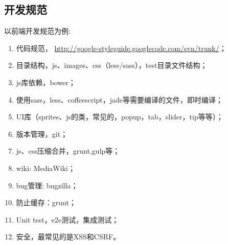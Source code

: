 \subsection{开发规范}
\par 以前端开发规范为例:
\begin{enumerate}[label=(\arabic*)]
    \item 代码规范， \url{http://google-styleguide.googlecode.com/svn/trunk/}；
    \item 目录结构，js、images、css（less/sass），test目录文件结构；
    \item js库依赖，bower；
    \item 使用sass，less、coffeescript，jade等需要编译的文件，即时编译；
    \item UI库（sprites、js的类，常见的，popup，tab，slider，tip等等）；
    \item 版本管理，git；
    \item js、css压缩合并，grunt,gulp等；
    \item wiki: MediaWiki；  
    \item bug管理: bugzilla；    
    \item 防止缓存：grunt；
    \item Unit test，e2e测试，集成测试；      
    \item 安全，最常见的是XSS和CSRF。
\end{enumerate}

